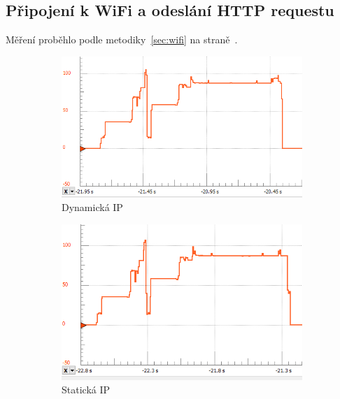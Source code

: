 \documentclass[a4paper, 12pt]{report}
\begin{document}
    \subsection{Připojení k WiFi a odeslání HTTP requestu}
    Měření proběhlo podle metodiky~\ref{sec:wifi} na straně~\pageref{sec:wifi}.
    \begin{figure}[h!]
        \centering
        \begin{subfigure}[b]{0.4\linewidth}
            \includegraphics[width=\linewidth]{images/ESP32_network_dynamic_specific}
            \caption{Dynamická IP}
        \end{subfigure}
        \begin{subfigure}[b]{0.4\linewidth}
            \includegraphics[width=\linewidth]{images/ESP32_network_static}
            \caption{Statická IP}
        \end{subfigure}
        \begin{subfigure}[b]{0.4\linewidth}

\end{subfigure}
\end{figure}
\end{document}
